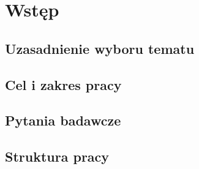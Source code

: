 \chapter{Wstęp}\label{ch:wstep}
\section{Uzasadnienie wyboru tematu}
\section{Cel i zakres pracy}
\section{Pytania badawcze}
\section{Struktura pracy}
